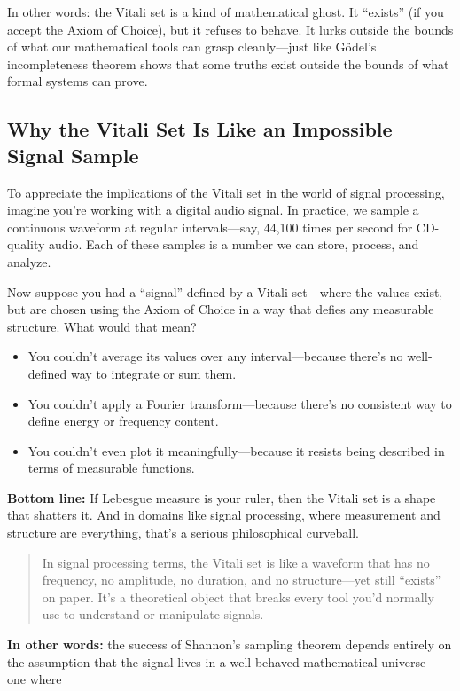 In other words: the Vitali set is a kind of mathematical ghost. It “exists” (if you accept the Axiom of Choice), but it refuses to behave. It lurks outside the bounds of what our mathematical tools can grasp cleanly—just like Gödel’s incompleteness theorem shows that some truths exist outside the bounds of what formal systems can prove.

\subsection{Why the Vitali Set Is Like an Impossible Signal Sample}

To appreciate the implications of the Vitali set in the world of signal processing, imagine you're working with a digital audio signal. In practice, we sample a continuous waveform at regular intervals—say, 44,100 times per second for CD-quality audio. Each of these samples is a number we can store, process, and analyze.

Now suppose you had a “signal” defined by a Vitali set—where the values exist, but are chosen using the Axiom of Choice in a way that defies any measurable structure. What would that mean?

\begin{itemize}
  \item You couldn’t average its values over any interval—because there's no well-defined way to integrate or sum them.
  \item You couldn’t apply a Fourier transform—because there’s no consistent way to define energy or frequency content.
  \item You couldn’t even plot it meaningfully—because it resists being described in terms of measurable functions.
\end{itemize}

\textbf{Bottom line:} If Lebesgue measure is your ruler, then the Vitali set is a shape that shatters it. And in domains like signal processing, where measurement and structure are everything, that’s a serious philosophical curveball.


\begin{quote}
In signal processing terms, the Vitali set is like a waveform that has no frequency, no amplitude, no duration, and no structure—yet still “exists” on paper. It’s a theoretical object that breaks every tool you’d normally use to understand or manipulate signals.
\end{quote}


\textbf{In other words:} the success of Shannon's sampling theorem depends entirely on the assumption that the signal lives in a well-behaved mathematical universe—one where 

